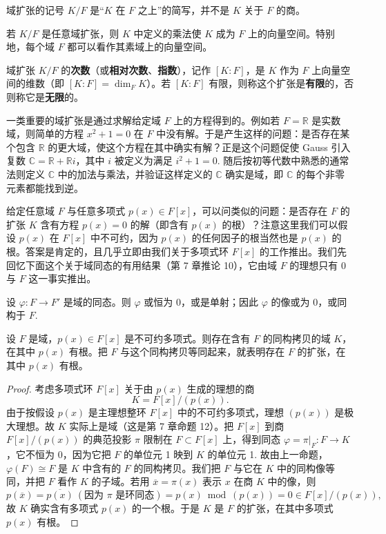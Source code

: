 域扩张的记号 \(K/F\) 是“\(K\) 在 \(F\) 之上”的简写，并不是 \(K\) 关于 \(F\) 的商。

若 \(K/F\) 是任意域扩张，则 \(K\) 中定义的乘法使 \(K\) 成为 \(F\) 上的向量空间。特别地，每个域 \(F\) 都可以看作其素域上的向量空间。

\begin{definition}
域扩张 \(K/F\) 的\textbf{次数}（或\textbf{相对次数}、\textbf{指数}），记作 \([K:F]\)，是 \(K\) 作为 \(F\) 上向量空间的维数（即 \([K:F] = \dim_F K\)）。若 \([K:F]\) 有限，则称这个扩张是\textbf{有限}的，否则称它是\textbf{无限}的。
\end{definition}

一类重要的域扩张是通过求解给定域 \(F\) 上的方程得到的。例如若 \(F = \mathbb{R}\) 是实数域，则简单的方程 \(x^2+1 = 0\) 在 \(F\) 中没有解。于是产生这样的问题：是否存在某个包含 \(\mathbb{R}\) 的更大域，使这个方程在其中确实有解？正是这个问题促使 Gauss 引入复数 \(\mathbb{C} = \mathbb{R}+\mathbb{R}i\)，其中 \(i\) 被定义为满足 \(i^2+1 = 0\). 随后按初等代数中熟悉的通常法则定义 \(\mathbb{C}\) 中的加法与乘法，并验证这样定义的 \(\mathbb{C}\) 确实是域，即 \(\mathbb{C}\) 的每个非零元素都能找到逆。

给定任意域 \(F\) 与任意多项式 \(p(x) \in F[x]\)，可以问类似的问题：是否存在 \(F\) 的扩张 \(K\) 含有方程 \(p(x) = 0\) 的解（即含有 \(p(x)\) 的根）？注意这里我们可以假设 \(p(x)\) 在 \(F[x]\) 中不可约，因为 \(p(x)\) 的任何因子的根当然也是 \(p(x)\) 的根。答案是肯定的，且几乎立即由我们关于多项式环 \(F[x]\) 的工作推出。我们先回忆下面这个关于域同态的有用结果（第 7 章推论 10），它由域 \(F\) 的理想只有 0 与 \(F\) 这一事实推出。

\begin{proposition}\label{pro:13.2}
设 \(\varphi : F \to F'\) 是域的同态。则 \(\varphi\) 或恒为 0，或是单射；因此 \(\varphi\) 的像或为 0，或同构于 \(F\).
\end{proposition}

\begin{theorem}\label{thm:13.3}
设 \(F\) 是域，\(p(x) \in F[x]\) 是不可约多项式。则存在含有 \(F\) 的同构拷贝的域 \(K\)，在其中 \(p(x)\) 有根。把 \(F\) 与这个同构拷贝等同起来，就表明存在 \(F\) 的扩张，在其中 \(p(x)\) 有根。
\end{theorem}

\begin{proof}
考虑多项式环 \(F[x]\) 关于由 \(p(x)\) 生成的理想的商
\[
K = F[x]/(p(x)).
\]
由于按假设 \(p(x)\) 是主理想整环 \(F[x]\) 中的不可约多项式，理想 \((p(x))\) 是极大理想。故 \(K\) 实际上是域（这是第 7 章命题 12）。把 \(F[x]\) 到商 \(F[x]/(p(x))\) 的典范投影 \(\pi\) 限制在 \(F \subset F[x]\) 上，得到同态 \(\varphi = \pi|_F : F \to K\)，它不恒为 0，因为它把 \(F\) 的单位元 1 映到 \(K\) 的单位元 1. 故由上一命题，\(\varphi(F) \cong F\) 是 \(K\) 中含有的 \(F\) 的同构拷贝。我们把 \(F\) 与它在 \(K\) 中的同构像等同，并把 \(F\) 看作 \(K\) 的子域。若用 \(\overline{x} = \pi(x)\) 表示 \(x\) 在商 \(K\) 中的像，则
\[
p(\overline{x}) = \overline{p(x)} \ (\text{因为 } \pi \text{ 是环同态}) = p(x) \bmod (p(x)) = 0 \in F[x]/(p(x)),
\]
故 \(K\) 确实含有多项式 \(p(x)\) 的一个根。于是 \(K\) 是 \(F\) 的扩张，在其中多项式 \(p(x)\) 有根。
\end{proof}

